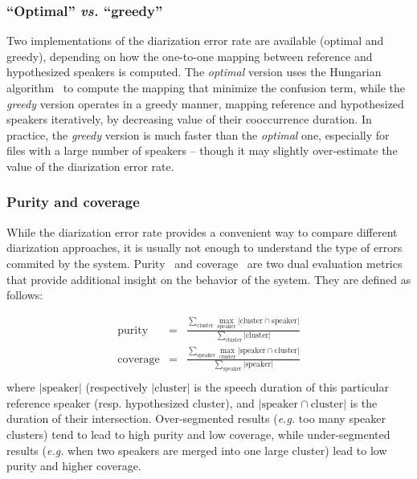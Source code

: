 \documentclass[a4paper]{article}
\begin{document}
\subsubsection{``Optimal'' \emph{vs.} ``greedy''}

Two implementations of the diarization error rate are available (optimal and greedy), depending on how the one-to-one mapping between reference and hypothesized speakers is computed.
The \emph{optimal} version uses the Hungarian algorithm~\cite{Kuhn1955} to compute the mapping that minimize the confusion term, while the \emph{greedy} version operates in a greedy manner, mapping reference and hypothesized speakers iteratively, by decreasing value of their cooccurrence duration.
In practice, the \emph{greedy} version is much faster than the \emph{optimal} one, especially for files with a large number of speakers -- though it may slightly over-estimate the value of the diarization error rate.

\subsubsection{Purity and coverage}

While the diarization error rate provides a convenient way to compare different diarization approaches, it is usually not enough to understand the type of errors commited by the system.
Purity~\cite{cettolo2000segmentation} and coverage~\cite{gauvain1998partitioning} are two dual evaluation metrics that provide additional insight on the behavior of the system.
They are defined as follows:

\begin{eqnarray*}
   \text{purity} & = & \frac{\displaystyle \sum_{\text{cluster}} \max_{\text{speaker}} |\text{cluster} \cap \text{speaker}|  }{\displaystyle \sum_{\text{cluster}} |\text{cluster}|} \\
  \text{coverage} & = & \frac{\displaystyle \sum_{\text{speaker}} \max_{\text{cluster}} |\text{speaker} \cap \text{cluster}|  }{\displaystyle \sum_{\text{speaker}} |\text{speaker}|} \\
\end{eqnarray*}
where $|\text{speaker}|$ (respectively $|\text{cluster}|$ is the speech duration of this particular reference speaker (resp. hypothesized cluster), and  $|\text{speaker} \cap \text{cluster}|$ is the duration of their intersection.
Over-segmented results (\emph{e.g.} too many speaker clusters) tend to lead to high purity and low coverage, while under-segmented results (\emph{e.g.} when two speakers are merged into one large cluster) lead to low purity and higher coverage.
\end{document}
